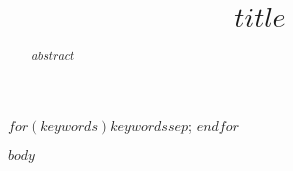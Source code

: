 \documentclass[$paper-refs$]{oup-contemporary}
\title{$title$}
\begin{document}
\begin{frontmatter}
\maketitle
\begin{abstract}
$abstract$
\end{abstract}

\begin{keywords}
$for(keywords)$$keywords$$sep$; $endfor$
\end{keywords}
\end{frontmatter}



$body$

\end{document}
